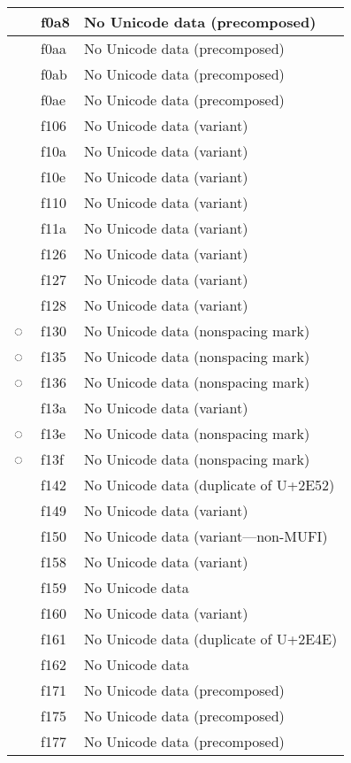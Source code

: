 \documentclass[12pt,letterpaper,openany]{book}
\begin{document}
\begin{center}
\begin{supertabular}{|m{0.25in}|m{0.5in}|m{4in}|}
			 & f0a8 & No Unicode data (precomposed)\\\hline
			 & f0aa & No Unicode data (precomposed)\\\hline
			 & f0ab & No Unicode data (precomposed)\\\hline
			 & f0ae & No Unicode data (precomposed)\\\hline
			 & f106 & No Unicode data (variant)\\\hline
			 & f10a & No Unicode data (variant)\\\hline
			 & f10e & No Unicode data (variant)\\\hline
			 & f110 & No Unicode data (variant)\\\hline
			 & f11a & No Unicode data (variant)\\\hline
			 & f126 & No Unicode data (variant)\\\hline
			 & f127 & No Unicode data (variant)\\\hline
			 & f128 & No Unicode data (variant)\\\hline
			◌ & f130 & No Unicode data (nonspacing mark)\\\hline
			◌ & f135 & No Unicode data (nonspacing mark)\\\hline
			◌ & f136 & No Unicode data (nonspacing mark)\\\hline
			 & f13a & No Unicode data (variant)\\\hline
			◌ & f13e & No Unicode data (nonspacing mark)\\\hline
			◌ & f13f & No Unicode data (nonspacing mark)\\\hline
			 & f142 & No Unicode data (duplicate of U+2E52)\\\hline
			 & f149 & No Unicode data (variant)\\\hline
			 & f150 & No Unicode data (variant---non-MUFI)\\\hline
			 & f158 & No Unicode data (variant)\\\hline
			 & f159 & No Unicode data\\\hline
			 & f160 & No Unicode data (variant)\\\hline
			 & f161 & No Unicode data (duplicate of U+2E4E)\\\hline
			 & f162 & No Unicode data\\\hline
			 & f171 & No Unicode data (precomposed)\\\hline
			 & f175 & No Unicode data (precomposed)\\\hline
			 & f177 & No Unicode data (precomposed)\\\hline

\end{supertabular}
\end{center}
\end{document}

